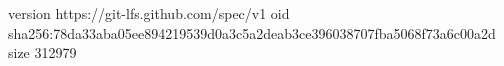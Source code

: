 version https://git-lfs.github.com/spec/v1
oid sha256:78da33aba05ee894219539d0a3c5a2deab3ce396038707fba5068f73a6c00a2d
size 312979

